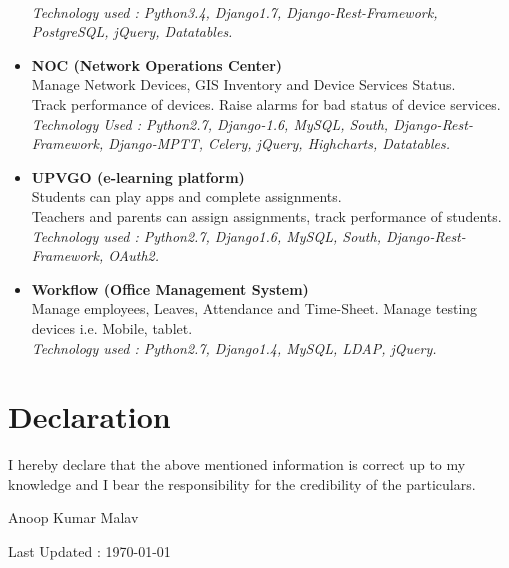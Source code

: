 \documentclass[11pt]{article}
\begin{document}
\begin{itemize}
    \\ \textit{Technology used : Python3.4, Django1.7, Django-Rest-Framework, PostgreSQL, jQuery, Datatables.}
 \item \textbf{NOC (Network Operations Center)}
    \\ Manage Network Devices, GIS Inventory and Device Services Status.
    \\ Track performance of devices. Raise alarms for bad status of device services.
    \\ \textit{Technology Used : Python2.7, Django-1.6, MySQL, South, Django-Rest-Framework, Django-MPTT, Celery, jQuery, Highcharts, Datatables.}
 \item \textbf{UPVGO (e-learning platform)}
    \\ Students can play apps and complete assignments.
    \\ Teachers and parents can assign assignments, track performance of students.
    \\ \textit{Technology used : Python2.7, Django1.6, MySQL, South, Django-Rest-Framework, OAuth2.}
 \item \textbf{Workflow (Office Management System)}
    \\ Manage employees, Leaves, Attendance and Time-Sheet. Manage testing devices i.e. Mobile, tablet.
    \\ \textit{Technology used : Python2.7, Django1.4, MySQL, LDAP, jQuery.}
\end{itemize}


\section*{Declaration}
I hereby declare that the above mentioned information is correct up to
my knowledge and I bear the responsibility for the credibility of the particulars.\\
\begin{flushright}
 Anoop Kumar Malav
\end{flushright}
\begin{center}

Last Updated : \today

\end{center}
\end{document}
